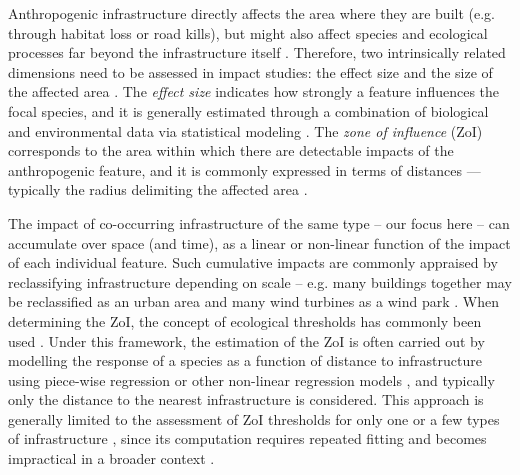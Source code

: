 \documentclass[titlepage]{article}
\begin{document}
Anthropogenic infrastructure directly affects the area where they are built (e.g. through habitat loss or road kills), but might also affect species and ecological processes far beyond the infrastructure itself \citep[e.g. by causing avoidance responses and reducing the probability of animal occurrence in its proximity;][]{dorber_indicators_2022,johnson_cumulative_2005,torres_assessing_2016}. Therefore, two intrinsically related dimensions need to be assessed in impact studies: the effect size and the size of the affected area \citep[Box 1; ][]{naugle_unifying_2011}. The \textit{effect size} indicates how strongly a feature influences the focal species, and it is generally estimated through a combination of biological and environmental data via statistical modeling \citep[Box 1;][]{polfus_identifying_2011}. The \textit{zone of influence} (ZoI) 
corresponds to the area within which there are detectable impacts of the anthropogenic feature, and it is commonly expressed in terms of distances --- typically the radius delimiting the affected area \citep[Box 1;][]{boulanger_estimation_2021,polfus_identifying_2011}. 

The impact of co-occurring infrastructure of the same type -- our focus here -- can accumulate over space (and time), as a 
linear or non-linear function of the impact of each individual feature. Such cumulative impacts are commonly appraised by reclassifying infrastructure depending on scale -- e.g. many buildings together may be reclassified as an urban area and many wind turbines as a wind park \citep{torres_assessing_2016}.
When determining the ZoI, the concept of ecological thresholds
has commonly been used \citep[see][and analytical procedures therein]{ficetola_ecological_2009}. Under this framework, the estimation of the ZoI is often carried out by modelling the response of a species as a function of distance to infrastructure using piece-wise regression or other non-linear regression models \citep[e.g. exponential decay or generalized additive models;][]{ficetola_ecological_2009,skarin_out_2018}, and typically only the distance to the nearest infrastructure is considered. This approach is generally limited to the assessment of ZoI thresholds for only one or a few types of infrastructure \citep[e.g.][]{boulanger_estimation_2021}, since its computation requires repeated fitting and becomes impractical in a broader context \citep{lee_estimating_2020}. 
\end{document}
